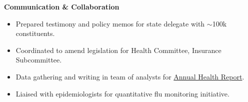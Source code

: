 \documentclass[a4paper, margin]{res}
\begin{document}
\begin{sloppypar}
\begin{resume}


\textbf{Communication \& Collaboration} \\
\begin{itemize}
    \item Prepared testimony and policy memos for state delegate with $\sim$100k constituents. 
    \item Coordinated to amend legislation for Health Committee, Insurance Subcommittee.
\end{itemize}

\begin{itemize}
    \item Data gathering and writing in team of analysts for \href{http://www.baltimorehealth.org/hsr2008.html}{Annual Health Report}.
    \item Liaised with epidemiologists for quantitative flu monitoring initiative.
\end{itemize}






\end{resume}
\end{sloppypar}
\end{document}
